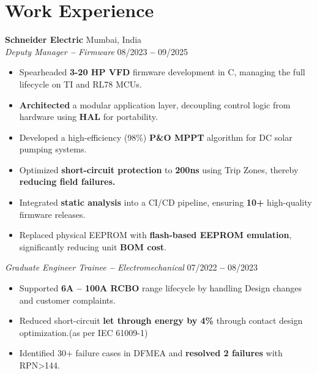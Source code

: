 \documentclass[letterpaper,11pt]{article}
\begin{document}
\section{Work Experience}
\textbf{Schneider Electric} \hfill Mumbai, India \\
\textit{Deputy Manager \textbf{--} Firmware} \hfill 08/2023  \textbf{--}  09/2025 \\
\begin{itemize}[leftmargin=*]
    \item Spearheaded \textbf{3-20 HP VFD} firmware development in C, managing the full lifecycle on TI and RL78 MCUs.
    \item \textbf{Architected} a modular application layer, decoupling control logic from hardware using \textbf{HAL} for portability.
    \item Developed a high-efficiency (98\%) \textbf{P\&O MPPT} algorithm for DC solar pumping systems.
    \item Optimized \textbf{short-circuit protection} to \textbf{200ns} using Trip Zones, thereby \textbf{reducing field failures.}    
    \item Integrated \textbf{static analysis} into a CI/CD pipeline, ensuring \textbf{10+} high-quality firmware releases. 
    \item Replaced physical EEPROM with \textbf{flash-based EEPROM emulation}, significantly reducing unit \textbf{BOM cost}.
  \end{itemize}
\vspace{8pt}
\noindent
\textit{Graduate Engineer Trainee \textbf{--} Electromechanical} \hfill 07/2022 \textbf{--} 08/2023 \\
\begin{itemize}[leftmargin=*]
    \item Supported \textbf{6A -- 100A RCBO} range lifecycle by handling Design changes and customer complaints.
    \item Reduced short-circuit \textbf{let through energy by 4\%} through contact design optimization.(as per IEC 61009-1)
    \item Identified 30+ failure cases in DFMEA and \textbf{resolved 2 failures} with RPN>144.
  \end{itemize}
\end{document}
